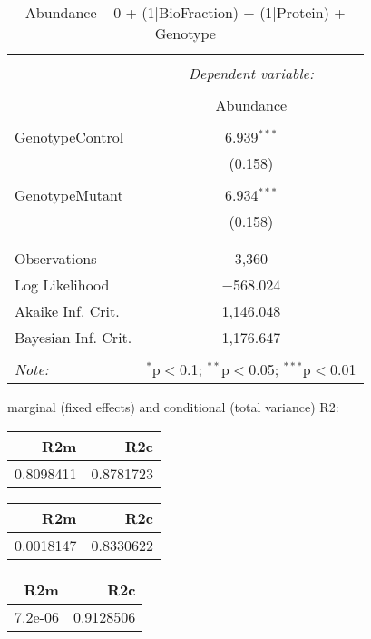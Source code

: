 \documentclass[11pt]{report}
\begin{document}
\begin{table}[!htbp] \centering 
  \caption{Abundance ~ 0 + (1|BioFraction) + (1|Protein) + Genotype} 
  \label{} 
\begin{tabular}{@{\extracolsep{5pt}}lc} 
\\[-1.8ex]\hline 
\hline \\[-1.8ex] 
 & \multicolumn{1}{c}{\textit{Dependent variable:}} \\ 
\cline{2-2} 
\\[-1.8ex] & Abundance \\ 
\hline \\[-1.8ex] 
 GenotypeControl & 6.939$^{***}$ \\ 
  & (0.158) \\ 
  & \\ 
 GenotypeMutant & 6.934$^{***}$ \\ 
  & (0.158) \\ 
  & \\ 
\hline \\[-1.8ex] 
Observations & 3,360 \\ 
Log Likelihood & $-$568.024 \\ 
Akaike Inf. Crit. & 1,146.048 \\ 
Bayesian Inf. Crit. & 1,176.647 \\ 
\hline 
\hline \\[-1.8ex] 
\textit{Note:}  & \multicolumn{1}{r}{$^{*}$p$<$0.1; $^{**}$p$<$0.05; $^{***}$p$<$0.01} \\ 
\end{tabular} 
\end{table} 
marginal (fixed effects) and conditional (total variance) R2:

\begin{tabular}{r|r}
\hline
R2m & R2c\\
\hline
0.8098411 & 0.8781723\\
\hline
\end{tabular}

\begin{tabular}{r|r}
\hline
R2m & R2c\\
\hline
0.0018147 & 0.8330622\\
\hline
\end{tabular}

\begin{tabular}{r|r}
\hline
R2m & R2c\\
\hline
7.2e-06 & 0.9128506\\
\hline
\end{tabular}
\end{document}

